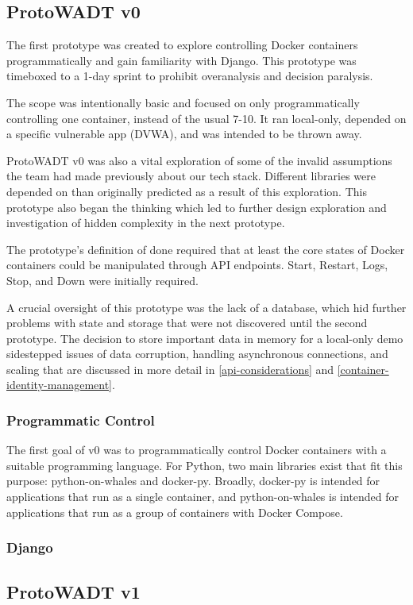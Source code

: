 \documentclass[../design-document.tex]{subfiles}
\begin{document}
\subsection{ProtoWADT v0}
The first prototype was created to explore controlling Docker containers programmatically and gain familiarity with Django. This prototype was timeboxed to a 1-day sprint to prohibit overanalysis and decision paralysis.

The scope was intentionally basic and focused on only programmatically controlling one container, instead of the usual 7-10. It ran local-only,
depended on a specific vulnerable app (DVWA), and was intended to be thrown away.

ProtoWADT v0 was also a vital exploration of some of the invalid assumptions the team had made previously about our tech stack. Different libraries were depended on than originally predicted as a result of this exploration. This prototype also began the thinking which led to further design exploration and investigation of hidden complexity in the next prototype.

The prototype's definition of done required that at least the core states of Docker containers could be manipulated through API endpoints. Start, Restart, Logs, Stop, and Down were initially required.

A crucial oversight of this prototype was the lack of a database, which hid further problems with state and storage that were not discovered until the second prototype. The decision to store important data in memory for a local-only demo sidestepped issues of data corruption, handling asynchronous connections, and scaling that are discussed in more detail in \ref{api-considerations} and \ref{container-identity-management}.

\subsubsection{Programmatic Control}
The first goal of v0 was to programmatically control Docker containers with a suitable programming language. For Python, two main libraries exist that fit this purpose: python-on-whales and docker-py. Broadly, docker-py is intended for applications that run as a single container, and python-on-whales is intended for applications that run as a group of containers with Docker Compose.

\subsubsection{Django}

\subsection{ProtoWADT v1}
\end{document}
